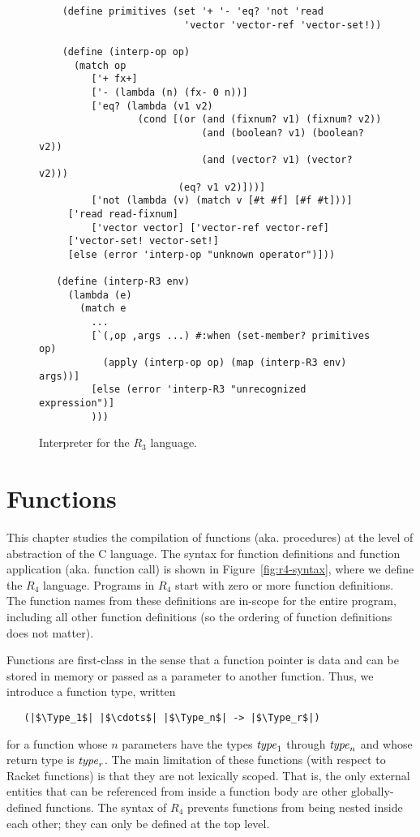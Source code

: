 \documentclass[11pt]{book}
\begin{document}
\begin{figure}[tbp]
\begin{lstlisting}
    (define primitives (set '+ '- 'eq? 'not 'read 
                         'vector 'vector-ref 'vector-set!))

    (define (interp-op op)
      (match op
         ['+ fx+]
         ['- (lambda (n) (fx- 0 n))]
         ['eq? (lambda (v1 v2)
                 (cond [(or (and (fixnum? v1) (fixnum? v2))
                            (and (boolean? v1) (boolean? v2))
                            (and (vector? v1) (vector? v2)))
                        (eq? v1 v2)]))]
         ['not (lambda (v) (match v [#t #f] [#f #t]))]
	 ['read read-fixnum]
         ['vector vector] ['vector-ref vector-ref]
	 ['vector-set! vector-set!]
	 [else (error 'interp-op "unknown operator")]))

   (define (interp-R3 env)
     (lambda (e)
       (match e
         ...
         [`(,op ,args ...) #:when (set-member? primitives op)
           (apply (interp-op op) (map (interp-R3 env) args))]
         [else (error 'interp-R3 "unrecognized expression")]
         )))
\end{lstlisting}
\caption{Interpreter for the $R_3$ language.}
\label{fig:interp-R3}
\end{figure}


\chapter{Functions}
\label{ch:functions}

This chapter studies the compilation of functions (aka. procedures) at
the level of abstraction of the C language. The syntax for function
definitions and function application (aka. function call) is shown in
Figure~\ref{fig:r4-syntax}, where we define the $R_4$ language.
Programs in $R_4$ start with zero or more function definitions.  The
function names from these definitions are in-scope for the entire
program, including all other function definitions (so the ordering of
function definitions does not matter).

Functions are first-class in the sense that a function pointer is data
and can be stored in memory or passed as a parameter to another
function.  Thus, we introduce a function type, written
\begin{lstlisting}
   (|$\Type_1$| |$\cdots$| |$\Type_n$| -> |$\Type_r$|)
\end{lstlisting}
for a function whose $n$ parameters have the types $\mathit{type}_1$ through
$\mathit{type}_n$ and whose return type is $\mathit{type}_r$. The main limitation of
these functions (with respect to Racket functions) is that they are
not lexically scoped. That is, the only external entities that can be
referenced from inside a function body are other globally-defined
functions. The syntax of $R_4$ prevents functions from being nested
inside each other; they can only be defined at the top level.
\end{document}
